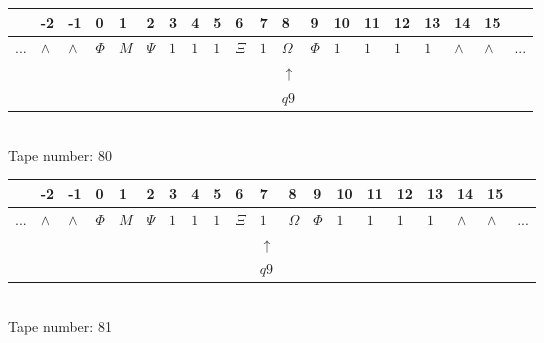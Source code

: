 \documentclass[11pt]{article}
\begin{document}
\begin{table}[H]
\centering
\begin{tabular}{llllllllllllllllllll}
 & -2 & -1 & 0 & 1 & 2 & 3 & 4 & 5 & 6 & 7 & 8 & 9 & 10 & 11 & 12 & 13 & 14 & 15 & \\
\hline
$...$ & \multicolumn{1}{|l|}{$\wedge$} & \multicolumn{1}{|l|}{$\wedge$} & \multicolumn{1}{|l|}{$\Phi$} & \multicolumn{1}{|l|}{$M$} & \multicolumn{1}{|l|}{$\Psi$} & \multicolumn{1}{|l|}{$1$} & \multicolumn{1}{|l|}{$1$} & \multicolumn{1}{|l|}{$1$} & \multicolumn{1}{|l|}{$\Xi$} & \multicolumn{1}{|l|}{$1$} & \multicolumn{1}{|l|}{$\Omega$} & \multicolumn{1}{|l|}{$\Phi$} & \multicolumn{1}{|l|}{$1$} & \multicolumn{1}{|l|}{$1$} & \multicolumn{1}{|l|}{$1$} & \multicolumn{1}{|l|}{$1$} & \multicolumn{1}{|l|}{$\wedge$} & \multicolumn{1}{|l|}{$\wedge$} & $...$\\
\hline
&  &  &  &  &  &  &  &  &  &  & $\uparrow$ &  &  &  &  &  &  &  &  \\
&  &  &  &  &  &  &  &  &  &  & $ q9 $ &  &  &  &  &  &  &  &  \\
\end{tabular}
\\
Tape number: 80
\noindent\makebox[\linewidth]{\hdashrule{\textwidth}{1pt}{1pt}}\end{table}

\begin{table}[H]
\centering
\begin{tabular}{llllllllllllllllllll}
 & -2 & -1 & 0 & 1 & 2 & 3 & 4 & 5 & 6 & 7 & 8 & 9 & 10 & 11 & 12 & 13 & 14 & 15 & \\
\hline
$...$ & \multicolumn{1}{|l|}{$\wedge$} & \multicolumn{1}{|l|}{$\wedge$} & \multicolumn{1}{|l|}{$\Phi$} & \multicolumn{1}{|l|}{$M$} & \multicolumn{1}{|l|}{$\Psi$} & \multicolumn{1}{|l|}{$1$} & \multicolumn{1}{|l|}{$1$} & \multicolumn{1}{|l|}{$1$} & \multicolumn{1}{|l|}{$\Xi$} & \multicolumn{1}{|l|}{$1$} & \multicolumn{1}{|l|}{$\Omega$} & \multicolumn{1}{|l|}{$\Phi$} & \multicolumn{1}{|l|}{$1$} & \multicolumn{1}{|l|}{$1$} & \multicolumn{1}{|l|}{$1$} & \multicolumn{1}{|l|}{$1$} & \multicolumn{1}{|l|}{$\wedge$} & \multicolumn{1}{|l|}{$\wedge$} & $...$\\
\hline
&  &  &  &  &  &  &  &  &  & $\uparrow$ &  &  &  &  &  &  &  &  &  \\
&  &  &  &  &  &  &  &  &  & $ q9 $ &  &  &  &  &  &  &  &  &  \\
\end{tabular}
\\
Tape number: 81
\noindent\makebox[\linewidth]{\hdashrule{\textwidth}{1pt}{1pt}}\end{table}
\end{document}
